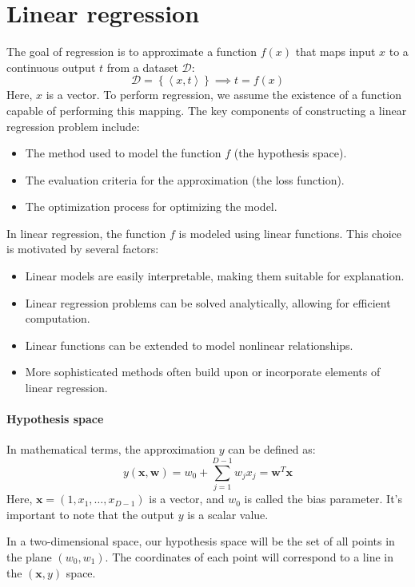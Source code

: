 \section{Linear regression}

The goal of regression is to approximate a function $f(x)$ that maps input $x$ to a continuous output $t$ from a dataset $\mathcal{D}$: 
\[\mathcal{D}=\left\{ \left\langle x,t \right\rangle \right\} \implies t=f(x)\]
Here, $x$ is a vector. 
To perform regression, we assume the existence of a function capable of performing this mapping.
The key components of constructing a linear regression problem include:
\begin{itemize}
    \item The method used to model the function $f$ (the hypothesis space). 
    \item The evaluation criteria for the approximation (the loss function).
    \item The optimization process for optimizing the model.
\end{itemize}

In linear regression, the function $f$ is modeled using linear functions. 
This choice is motivated by several factors:
\begin{itemize}
    \item Linear models are easily interpretable, making them suitable for explanation.
    \item Linear regression problems can be solved analytically, allowing for efficient computation.
    \item Linear functions can be extended to model nonlinear relationships.
    \item More sophisticated methods often build upon or incorporate elements of linear regression.
\end{itemize}

\paragraph*{Hypothesis space}
In mathematical terms, the approximation $y$ can be defined as: 
\[y(\textbf{x},\textbf{w})=w_0+\sum_{j=1}^{D-1}w_j x_j=\textbf{w}^T\textbf{x}\]
Here, $\textbf{x} = \left( 1,x_1,\dots,x_{D-1} \right)$ is a vector, and $w_0$ is called the bias parameter.
It's important to note that the output $y$ is a scalar value. 

In a two-dimensional space, our hypothesis space will be the set of all points in the plane $(w_0,w_1)$. 
The coordinates of each point will correspond to a line in the $\left( \textbf{x}, y \right)$ space.

